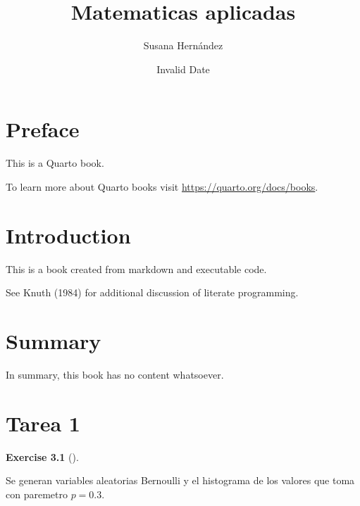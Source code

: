 \documentclass[
  letterpaper,
  DIV=11,
  numbers=noendperiod]{scrreprt}
\title{Matematicas aplicadas}
\author{Susana Hernández}
\date{Invalid Date}
\renewcommand*\contentsname{Table of contents}
\newcommand\contentsname{Table of contents}
\theoremstyle{plain}
\theoremstyle{definition}
\newtheorem{exercise}{Exercise}[chapter]
\theoremstyle{remark}
\begin{document}
\maketitle
\ifdefined\Shaded\renewenvironment{Shaded}{\begin{tcolorbox}[borderline west={3pt}{0pt}{shadecolor}, frame hidden, interior hidden, boxrule=0pt, sharp corners, breakable, enhanced]}{\end{tcolorbox}}\fi

\renewcommand*\contentsname{Table of contents}
{
\hypersetup{linkcolor=}
\setcounter{tocdepth}{2}
\tableofcontents
}

\hypertarget{preface}{%
\chapter*{Preface}\label{preface}}


This is a Quarto book.

To learn more about Quarto books visit
\url{https://quarto.org/docs/books}.


\hypertarget{introduction}{%
\chapter{Introduction}\label{introduction}}

This is a book created from markdown and executable code.

See Knuth (1984) for additional discussion of literate programming.


\hypertarget{summary}{%
\chapter{Summary}\label{summary}}

In summary, this book has no content whatsoever.


\hypertarget{tarea-1}{%
\chapter{Tarea 1}\label{tarea-1}}

\begin{exercise}[]\protect\hypertarget{exr-1}{}\label{exr-1}

Se generan variables aleatorias Bernoulli y el histograma de los valores
que toma con paremetro \(p=0.3\).

\end{exercise}
\end{document}
